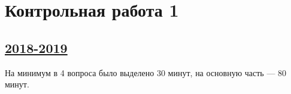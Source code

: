 
\newpage
\thispagestyle{empty}
\section{Контрольная работа 1}


\subsection[2018-2019]{\hyperref[sec:sol_kr_01_2018_2019]{2018-2019}}
\label{sec:kr_01_2018_2019} %

На минимум в 4 вопроса было выделено 30 минут, на основную часть — 80 минут.

